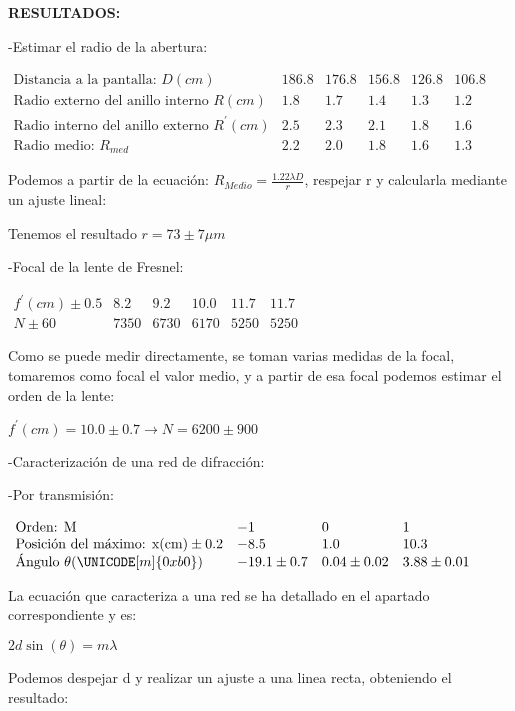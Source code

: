 \documentclass[12pt,thmsa]{article}
\begin{document}
\vspace{1pt}

\textbf{RESULTADOS:}

-Estimar el radio de la abertura:

$
\begin{array}{llllll}
\text{Distancia a la pantalla: }D(cm) & 186.8 & 176.8 & 156.8 & 126.8 & 106.8
\\ 
\text{Radio externo del anillo interno }R(cm) & 1.8 & 1.7 & 1.4 & 1.3 & 1.2
\\ 
\text{Radio interno del anillo externo }R^{\prime }(cm) & 2.5 & 2.3 & 2.1 & 
1.8 & 1.6 \\ 
\text{Radio medio: }R_{med} & 2.2 & 2.0 & 1.8 & 1.6 & 1.3
\end{array}
$

Podemos a partir de la ecuaci\'{o}n: $R_{Medio}=\frac{1.22\lambda D}{r}$,
respejar r y calcularla mediante un ajuste lineal:

Tenemos el resultado $r=73\pm 7\mu m$

-Focal de la lente de Fresnel:

$
\begin{array}{llllll}
f^{\prime }(cm)\pm 0.5 & 8.2 & 9.2 & 10.0 & 11.7 & 11.7 \\ 
N\pm 60 & 7350 & 6730 & 6170 & 5250 & 5250
\end{array}
$

Como se puede medir directamente, se toman varias medidas de la focal,
tomaremos como focal el valor medio, y a partir de esa focal podemos estimar
el orden de la lente:

$f^{\prime }(cm)=10.0\pm 0.7\longrightarrow N=6200\pm 900$

-Caracterizaci\'{o}n de una red de difracci\'{o}n:

-Por transmisi\'{o}n:

$
\begin{array}{llll}
\text{Orden: M} & -1 & 0 & 1 \\ 
\text{Posici\'{o}n del m\'{a}ximo: x(cm)}\pm 0.2 & -8.5 & 1.0 & 10.3 \\ 
\text{\'{A}ngulo }\theta (\UNICODE[m]{0xb0}) & -19.1\pm 0.7 & 0.04\pm 0.02 & 
3.88\pm 0.01
\end{array}
$

La ecuaci\'{o}n que caracteriza a una red se ha detallado en el apartado
correspondiente y es:

$2d\sin (\theta )=m\lambda $

Podemos despejar d y realizar un ajuste a una linea recta, obteniendo el
resultado:
\end{document}
